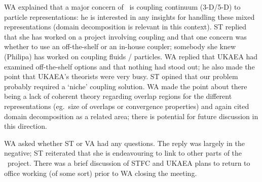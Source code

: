 WA explained that a major concern of \nep\  is coupling continuum (3-D/5-D) to 
particle representations: he is interested in any insights for handling these 
mixed representations (domain decomposition is relevant in this context).  ST 
replied that she has worked on a project involving coupling and that one 
concern was whether to use an off-the-shelf or an in-house coupler; somebody 
she knew (Philipa) has worked on coupling fluids / particles.  WA replied 
that UKAEA had examined off-the-shelf options and that nothing had stood out; 
he also made the point that UKAEA's theorists were very busy.  ST opined that 
our problem probably required a `niche' coupling solution.  WA made the point 
about there being a lack of coherent theory regarding overlap regions for the 
different representations (eg.\ size of overlaps or convergence properties) and 
again cited domain decomposition as a related area; there is potential for 
future discussion in this direction.

WA asked whether ST or VA had any questions.  The reply was largely in the 
negative; ST reiterated that she is endeavouring to link to other parts of the 
\nep\  project.  There was a brief discussion of STFC and UKAEA plans to 
return to office working (of some sort) prior to WA closing the meeting.


